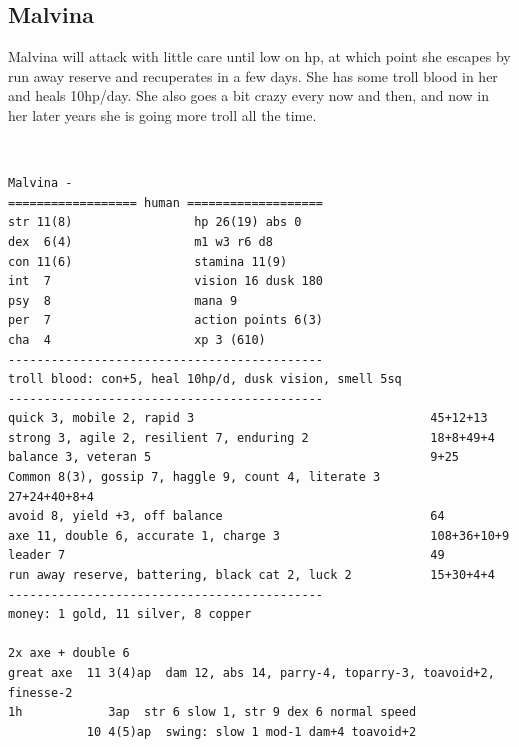 \clearpage
\begin{samepage}
\subsection*{Malvina}
Malvina will attack with little care until low on hp, at which point she escapes by run away reserve and recuperates in a few days. She has some troll blood in her and heals 10hp/day. She also goes a bit crazy every now and then, and now in her later years she is going more troll all the time.

\

\small \begin{verbatim}
Malvina -
================== human ===================
str 11(8)                 hp 26(19) abs 0
dex  6(4)                 m1 w3 r6 d8
con 11(6)                 stamina 11(9)
int  7                    vision 16 dusk 180
psy  8                    mana 9
per  7                    action points 6(3)
cha  4                    xp 3 (610)
--------------------------------------------
troll blood: con+5, heal 10hp/d, dusk vision, smell 5sq
--------------------------------------------
quick 3, mobile 2, rapid 3                                 45+12+13
strong 3, agile 2, resilient 7, enduring 2                 18+8+49+4
balance 3, veteran 5                                       9+25
Common 8(3), gossip 7, haggle 9, count 4, literate 3       27+24+40+8+4
avoid 8, yield +3, off balance                             64
axe 11, double 6, accurate 1, charge 3                     108+36+10+9
leader 7                                                   49
run away reserve, battering, black cat 2, luck 2           15+30+4+4
--------------------------------------------
money: 1 gold, 11 silver, 8 copper

2x axe + double 6
great axe  11 3(4)ap  dam 12, abs 14, parry-4, toparry-3, toavoid+2, finesse-2
1h            3ap  str 6 slow 1, str 9 dex 6 normal speed
           10 4(5)ap  swing: slow 1 mod-1 dam+4 toavoid+2
\end{verbatim} \normalsize
\end{samepage}








